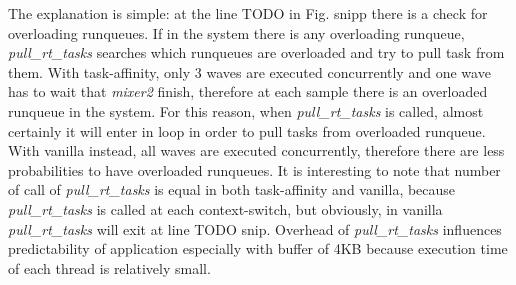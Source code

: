\begin{description}
The explanation is simple: at the line TODO in Fig. snipp there is a check for overloading runqueues. If in the system there is any overloading runqueue, 
\textit{pull\_rt\_tasks} searches which runqueues are overloaded and try to pull task from them. With task-affinity, only 3 waves are executed concurrently 
and one wave has to wait that \textit{mixer2} finish, therefore at each sample there is an overloaded runqueue in the system. For this reason, when 
\textit{pull\_rt\_tasks} is called, almost certainly it will enter in loop in order to pull tasks from overloaded runqueue. With vanilla instead, all waves 
are executed concurrently, therefore there are less probabilities to have overloaded runqueues. It is interesting to note that number of call of 
\textit{pull\_rt\_tasks} is equal in both task-affinity and vanilla, because \textit{pull\_rt\_tasks} is called at each context-switch, but obviously, in 
vanilla \textit{pull\_rt\_tasks} will exit at line TODO snip. Overhead of \textit{pull\_rt\_tasks} influences predictability of application especially with
buffer of 4KB because execution time of each thread is relatively small.

\end{description}


